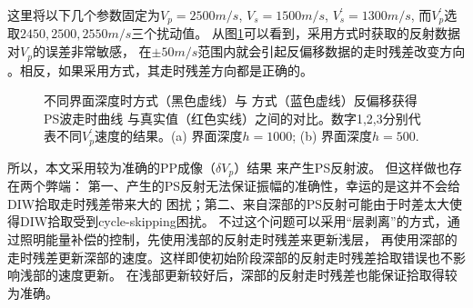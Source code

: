 这里将以下几个参数固定为$V_p=2500m/s$, $V_s=1500m/s$, $V^{'}_s=1300m/s$, 而$V^{'}_p$选取$2450,
2500, 2550m/s$三个扰动值。
从图\ref{fig:Sens_vp}可以看到，采用方式\uppercase\expandafter{}时获取的反射数据对$V_p$的误差非常敏感，
在$\pm50m/s$范围内就会引起反偏移数据的走时残差改变方向
。相反，如果采用方式\uppercase\expandafter{}，其走时残差方向都是正确的。
\begin{figure}[h]
   \centering
   \caption{不同界面深度时方式\uppercase\expandafter{}（黑色虚线）与
   方式\uppercase\expandafter{}（蓝色虚线）反偏移获得PS波走时曲线
   与真实值（红色实线）之间的对比。数字1,2,3分别代表不同$V^{'}_p$速度的结果。(a) 界面深度$h=1000$; (b) 界面深度$h=500$.}
   \label{fig:Sens_vp}
\end{figure}

所以，本文采用较为准确的PP成像（$\delta V_p$）结果
来产生PS反射波。
但这样做也存在两个弊端：
第一、产生的PS反射无法保证振幅的准确性，幸运的是这并不会给DIW拾取走时残差带来大的
困扰；第二、来自深部的PS反射可能由于时差太大使得DIW拾取受到cycle-skipping困扰。
不过这个问题可以采用“层剥离”的方式，通过照明能量补偿的控制，先使用浅部的反射走时残差来更新浅层，
再使用深部的走时残差更新深部的速度。这样即使初始阶段深部的反射走时残差拾取错误也不影响浅部的速度更新。
在浅部更新较好后，深部的反射走时残差也能保证拾取得较为准确。

